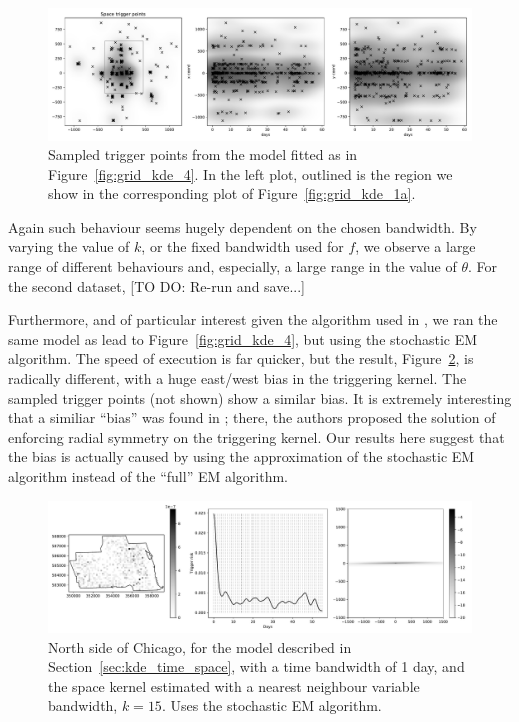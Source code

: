 \documentclass[twoside,a4paper]{article}
\theoremstyle{plain}
\theoremstyle{definition}
\begin{document}
\begin{figure}
  \includegraphics[width=\textwidth]{../notebooks/grid_kde_knn2.pdf}
  \caption{Sampled trigger points from the model fitted as in Figure~\ref{fig:grid_kde_4}.
  In the left plot, outlined is the region we show in the corresponding plot of
  Figure~\ref{fig:grid_kde_1a}.}
  \label{fig:grid_kde_4a}
\end{figure}

Again such behaviour seems hugely dependent on the chosen bandwidth.  By varying the
value of $k$, or the fixed bandwidth used for $f$, we observe a large range of different behaviours
and, especially, a large range in the value of $\theta$.  For the second dataset, [TO DO: Re-run and save...]

Furthermore, and of particular interest given the algorithm used in \cite{sepp}, we ran the same
model as lead to Figure~\ref{fig:grid_kde_4}, but using the stochastic EM algorithm.  The speed of
execution is far quicker, but the result, Figure~\ref{fig:grid_kde_5}, is radically different, with
a huge east/west bias in the triggering kernel.  The sampled trigger points (not shown) show a similar
bias.  It is extremely interesting that a similiar ``bias'' was found in \cite{rc}; there, the
authors proposed the solution of enforcing radial symmetry on the triggering kernel.  Our results
here suggest that the bias is actually caused by using the approximation of the stochastic EM
algorithm instead of the ``full'' EM algorithm.

\begin{figure}
  \includegraphics[width=\textwidth]{../notebooks/grid_kde_knn_sem_1.pdf}
  \caption{North side of Chicago, for the model described in Section~\ref{sec:kde_time_space},
  with a time bandwidth of 1 day, and the space kernel estimated with a nearest neighbour variable
  bandwidth, $k=15$.  Uses the stochastic EM algorithm.}
  \label{fig:grid_kde_5}
\end{figure}
\end{document}
